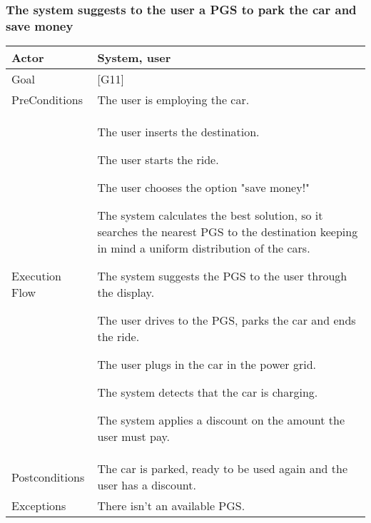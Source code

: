 \documentclass{article}
\begin{document}
	\subsubsection{The system suggests to the user a PGS to park the car and save money}
	\begin{tabularx}{\textwidth}{  l  X  }
		\hline
		Actor & System, user\\
		\hline
		Goal & [G11]\\
		\hline
		PreConditions & The user is employing the car.\\
		\hline
		Execution Flow & \item{The user inserts the destination.}
                     \item{The user starts the ride.}
                     \item{The user chooses the option "save money!"}
										 \item{The system calculates the best solution, so it searches the nearest PGS to the destination keeping in mind a uniform distribution of the cars.}
										 \item{The system suggests the PGS to the user through the display.}
										 \item{The user drives to the PGS, parks the car and ends the ride.}
										 \item{The user plugs in the car in the power grid.}
										 \item{The system detects that the car is charging.}
										 \item{The system applies a discount on the amount the user must pay.}\\
		\hline
		Postconditions & The car is parked, ready to be used again and the user has a discount.\\
		\hline
		Exceptions & \item{There isn't an available PGS.}\\
		\hline
	\end{tabularx}
\end{document}
